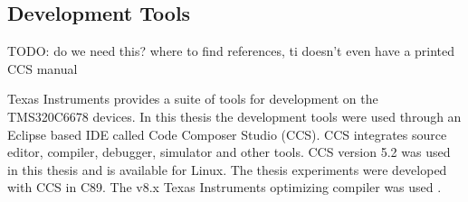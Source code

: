 \subsection{Development Tools}
\label{subsec:devtools}
TODO: do we need this? where to find references, ti doesn't even have a printed
CCS manual

Texas Instruments provides a suite of tools for development on the TMS320C6678
devices. In this thesis the development tools were used through an Eclipse based
IDE called Code Composer Studio (CCS). CCS integrates source editor, compiler,
debugger, simulator and other tools. CCS version 5.2 was used in this thesis
and is available for Linux. \cite{ccspage} The thesis experiments were developed
with CCS in C89. The v8.x Texas Instruments optimizing compiler was used
\cite{compilerguide}.
